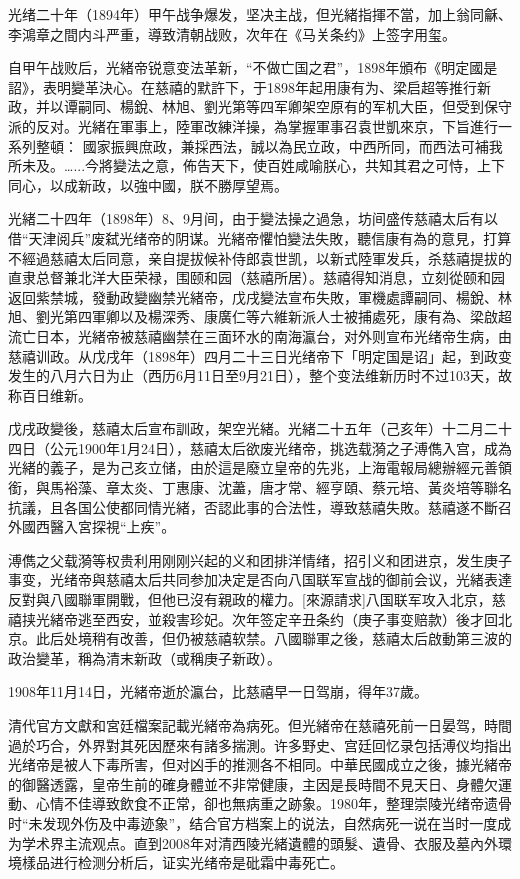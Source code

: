 光绪二十年（1894年）甲午战争爆发，坚决主战，但光緒指揮不當，加上翁同龢、李鴻章之間内斗严重，導致清朝战败，次年在《马关条约》上签字用玺。

自甲午战败后，光緒帝锐意变法革新，“不做亡国之君”，1898年頒布《明定國是詔》，表明變革決心。在慈禧的默許下，于1898年起用康有为、梁启超等推行新政，并以谭嗣同、楊銳、林旭、劉光第等四军卿架空原有的军机大臣，但受到保守派的反对。光緒在軍事上，陸軍改練洋操，為掌握軍事召袁世凱來京，下旨進行一系列整頓：
國家振興庶政，兼採西法，誠以為民立政，中西所同，而西法可補我所未及。…...今將變法之意，佈告天下，使百姓咸喻朕心，共知其君之可恃，上下同心，以成新政，以強中國，朕不勝厚望焉。

光緒二十四年（1898年）8、9月间，由于變法操之過急，坊间盛传慈禧太后有以借“天津阅兵”废弑光绪帝的阴谋。光緒帝懼怕變法失敗，聽信康有為的意見，打算不經過慈禧太后同意，亲自提拔候补侍郎袁世凯，以新式陸軍发兵，杀慈禧提拔的直隶总督兼北洋大臣荣禄，围颐和园（慈禧所居）。慈禧得知消息，立刻從颐和园返回紫禁城，發動政變幽禁光緒帝，戊戌變法宣布失敗，軍機處譚嗣同、楊銳、林旭、劉光第四軍卿以及楊深秀、康廣仁等六維新派人士被捕處死，康有為、梁啟超流亡日本，光緒帝被慈禧幽禁在三面环水的南海瀛台，对外则宣布光绪帝生病，由慈禧训政。从戊戌年（1898年）四月二十三日光绪帝下「明定国是诏」起，到政变发生的八月六日为止（西历6月11日至9月21日），整个变法维新历时不过103天，故称百日维新。

戊戌政變後，慈禧太后宣布訓政，架空光緒。光緒二十五年（己亥年）十二月二十四日（公元1900年1月24日），慈禧太后欲废光绪帝，挑选载漪之子溥儁入宫，成為光緒的義子，是为己亥立储，由於這是廢立皇帝的先兆，上海電報局總辦經元善領銜，與馬裕藻、章太炎、丁惠康、沈藎，唐才常、經亨頤、蔡元培、黃炎培等聯名抗議，且各国公使都同情光緒，否認此事的合法性，導致慈禧失敗。慈禧遂不斷召外國西醫入宮探視“上疾”。

溥儁之父载漪等权贵利用刚刚兴起的义和团排洋情绪，招引义和团进京，发生庚子事变，光绪帝與慈禧太后共同参加决定是否向八国联军宣战的御前会议，光緒表達反對與八國聯軍開戰，但他已沒有親政的權力。[來源請求]八国联军攻入北京，慈禧挟光緒帝逃至西安，並殺害珍妃。次年签定辛丑条约（庚子事变赔款）後才回北京。此后处境稍有改善，但仍被慈禧软禁。八國聯軍之後，慈禧太后啟動第三波的政治變革，稱為清末新政（或稱庚子新政）。

1908年11月14日，光緒帝逝於瀛台，比慈禧早一日驾崩，得年37歲。

清代官方文獻和宮廷檔案記載光緒帝為病死。但光緒帝在慈禧死前一日晏驾，時間過於巧合，外界對其死因歷來有諸多揣測。许多野史、宫廷回忆录包括溥仪均指出光绪帝是被人下毒所害，但对凶手的推测各不相同。中華民國成立之後，據光緒帝的御醫透露，皇帝生前的確身體並不非常健康，主因是長時間不見天日、身體欠運動、心情不佳導致飲食不正常，卻也無病重之跡象。1980年，整理崇陵光绪帝遗骨时“未发现外伤及中毒迹象”，结合官方档案上的说法，自然病死一说在当时一度成为学术界主流观点。直到2008年对清西陵光緒遺體的頭髮、遺骨、衣服及墓內外環境樣品进行检测分析后，证实光绪帝是砒霜中毒死亡。


